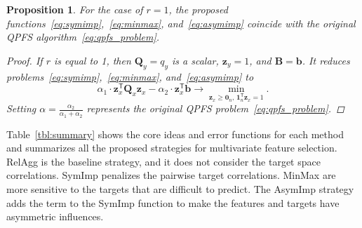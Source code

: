 \documentclass[preprint,12pt]{elsarticle}
\newtheorem{proposition}{Proposition}
\theoremstyle{definition}
\newcommand{\bz}{\mathbf{z}}
\newcommand{\bb}{\mathbf{b}}
\newcommand{\bB}{\mathbf{B}}
\newcommand{\bQ}{\mathbf{Q}}
\newcommand{\T}{\mathsf{T}}
\newcommand{\bOne}{\boldsymbol{1}}
\newcommand{\bZero}{\boldsymbol{0}}
\begin{document}
\begin{proposition}
	For the case of $r=1$, the proposed functions~\eqref{eq:symimp},~\eqref{eq:minmax}, and~\eqref{eq:asymimp} coincide with the original QPFS algorithm~\eqref{eq:qpfs_problem}.
	
	\begin{proof}
		If $r$ is equal to 1, then $\bQ_y = q_y$ is a scalar, $\bz_y = 1$, and $\bB = \bb$. It reduces problems~\eqref{eq:symimp},~\eqref{eq:minmax}, and~\eqref{eq:asymimp} to
		\begin{equation*}
		\alpha_1 \cdot \bz_x^{\T} \bQ_x \bz_x - \alpha_2 \cdot \bz_x^{\T} \bb \rightarrow \min_{\bz_x \geq \bZero_n, \, \bOne_n^{\T}\bz_x=1} .
		\end{equation*}
		Setting $\alpha = \frac{\alpha_2}{\alpha_1 + \alpha_2}$ represents the original QPFS problem~\eqref{eq:qpfs_problem}.
	\end{proof}
\end{proposition}

Table~\ref{tbl:summary} shows the core ideas and error functions for each method and summarizes all the proposed strategies for multivariate feature selection. 
RelAgg is the baseline strategy, and it does not consider the target space correlations.
SymImp penalizes the pairwise target correlations.
MinMax are more sensitive to the targets that are difficult to predict.
The AsymImp strategy adds the term to the SymImp function to make the features and targets have asymmetric influences. 
\end{document}
